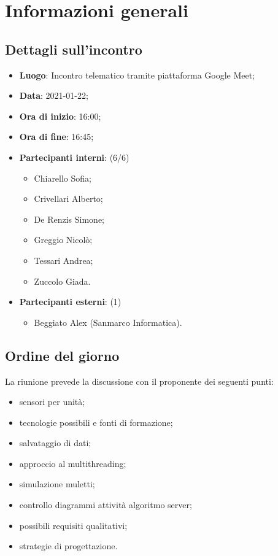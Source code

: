 \section{Informazioni generali}

\subsection{Dettagli sull'incontro}
\begin{itemize}
\item \textbf{Luogo}: Incontro telematico tramite piattaforma Google Meet;
\item \textbf{Data}: 2021-01-22;
\item \textbf{Ora di inizio}: 16:00;
\item \textbf{Ora di fine}: 16:45;
\item \textbf{Partecipanti interni}: (6/6)
\begin{itemize}
	\item Chiarello Sofia;
	\item Crivellari Alberto;
	\item De Renzis Simone;
	\item Greggio Nicolò;
	\item Tessari Andrea;
	\item Zuccolo Giada.
\end{itemize}
\item \textbf{Partecipanti esterni}: (1)
\begin{itemize}
	\item Beggiato Alex (Sanmarco Informatica).
\end{itemize}
\end{itemize}

\subsection{Ordine del giorno}

La riunione prevede la discussione con il proponente dei seguenti punti:
\begin{itemize}
	\item sensori per unità;
    \item tecnologie possibili e fonti di formazione;
    \item salvataggio di dati;
    \item approccio al multithreading;
    \item simulazione muletti;
    \item controllo diagrammi attività algoritmo server;
    \item possibili requisiti qualitativi;
    \item strategie di progettazione.
\end{itemize}




